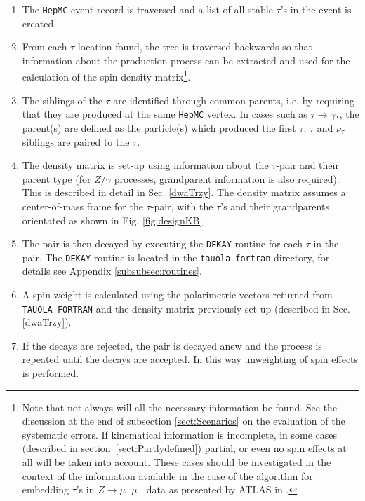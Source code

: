 \documentclass[]{Tauola_interface_design}
\begin{document}
\begin{enumerate}
\item The {\tt HepMC} event record is traversed and a list  of all stable $\tau$'s in the event is created.
\item From each $\tau$ location found, the tree is traversed backwards so
  that information about the production process can be extracted
  and used for the calculation of the spin density matrix\footnote{%
  Note that not always will all the necessary information be found. See the discussion
  at the end of subsection \ref{sect:Scenarios} on the evaluation
  of the systematic errors. If kinematical information is incomplete, in some
  cases (described in section~\ref{sect:Partlydefined}) partial,
   or even no  spin effects at all
  will be taken into account.
  These cases should be investigated in the context of the information available
  in the case of the algorithm for embedding $\tau$'s in 
  $Z \to \mu^+\mu^-$ data as presented
  by ATLAS in \cite{Aad:2011rv}.
  }.
\item The siblings of the $\tau$ are identified through common
  parents,  i.e. by requiring that they are produced at the same {\tt HepMC} vertex. In
  cases such as $\tau \rightarrow \gamma \tau$, the parent(s) are defined
  as the particle(s) which produced the first $\tau$; 
  $\tau$ and $\nu_\tau$ siblings are paired to the $\tau$.
\item The density matrix is set-up using information about the
  $\tau$-pair and their parent type (for $Z/\gamma$ processes,
  grandparent information is also required). This is described in
  detail in Sec. \ref{dwaTrzy}. The density matrix assumes
  a center-of-mass frame for the $\tau$-pair, with the $\tau$'s and their
  grandparents orientated as shown in Fig. \ref{fig:designKB}.

\item The pair is then decayed by executing the {\tt DEKAY} routine 
      for each $\tau$ in the pair. The {\tt DEKAY} routine
is located in  the {\tt tauola-fortran} directory, for details see Appendix
\ref{subsubsec:routines}.


\item A spin weight is calculated using the polarimetric vectors
  returned from {\tt TAUOLA FORTRAN} and the density matrix previously set-up (described in
  Sec. \ref{dwaTrzy}).
\item If the decays are rejected, the pair is decayed anew and the
  process is repeated until the decays are accepted. In this way unweighting of spin 
  effects is performed.


\end{enumerate}
\end{document}
